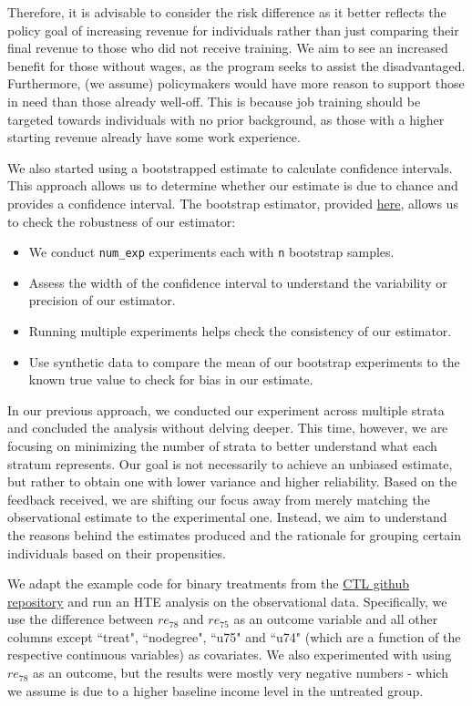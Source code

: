 \documentclass[12pt]{article}
\begin{document}
Therefore, it is advisable to consider the risk difference as it better reflects the policy goal of increasing revenue for individuals rather than just comparing their final revenue to those who did not receive training. We aim to see an increased benefit for those without wages, as the program seeks to assist the disadvantaged. Furthermore, (we assume) policymakers would have more reason to support those in need than those already well-off. This is because job training should be targeted towards individuals with no prior background, as those with a higher starting revenue already have some work experience.

We also started using a bootstrapped estimate to calculate confidence intervals. This approach allows us to determine whether our estimate is due to chance and provides a confidence interval. The bootstrap estimator, provided \href{https://github.com/cs396s24/Proj-Job-Training/blob/main/utils/bootstrap.py}{here}, allows us to check the robustness of our estimator:

\begin{itemize}[itemsep=-0.25em]
    \item We conduct {\tt num\_exp} experiments each with {\tt n} bootstrap samples.
    \item Assess the width of the confidence interval to understand the variability or precision of our estimator.
    \item Running multiple experiments helps check the consistency of our estimator.
    \item Use synthetic data to compare the mean of our bootstrap experiments to the known true value to check for bias in our estimate.
\end{itemize}

In our previous approach, we conducted our experiment across multiple strata and concluded the analysis without delving deeper. This time, however, we are focusing on minimizing the number of strata to better understand what each stratum represents. Our goal is not necessarily to achieve an unbiased estimate, but rather to obtain one with lower variance and higher reliability. Based on the feedback received, we are shifting our focus away from merely matching the observational estimate to the experimental one. Instead, we aim to understand the reasons behind the estimates produced and the rationale for grouping certain individuals based on their propensities.

We adapt the example code for binary treatments from the \href{https://github.com/edgeslab/CTL/tree/master}{CTL github repository} and run an HTE analysis on the observational data. Specifically, we use the difference between $re_{78}$ and $re_{75}$ as an outcome variable and all other columns except ``treat", ``nodegree", ``u75" and ``u74" (which are a function of the respective continuous variables) as covariates. We also experimented with using $re_{78}$ as an outcome, but the results were mostly very negative numbers - which we assume is due to a higher baseline income level in the untreated group.
\end{document}
